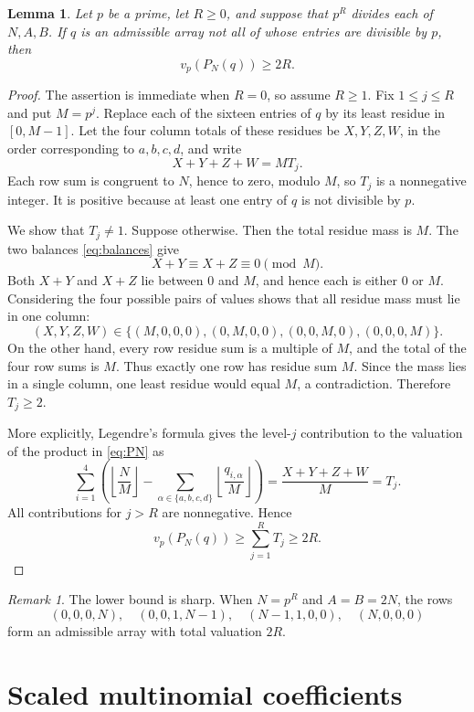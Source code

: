 \documentclass[11pt,reqno]{amsart}
\numberwithin{equation}{section}
\newtheorem{lemma}[theorem]{Lemma}
\theoremstyle{remark}
\newtheorem{remark}[theorem]{Remark}
\newcommand{\vp}{v_p}
\begin{document}
\begin{lemma}\label{lem:primitive}
Let \(p\) be a prime, let \(R\geq0\), and suppose that \(p^R\) divides
each of \(N,A,B\).
If \(q\) is an admissible array not all of whose entries are divisible by
\(p\), then
\[
\vp(P_N(q))\geq2R.
\]
\end{lemma}

\begin{proof}
The assertion is immediate when \(R=0\), so assume \(R\geq1\).
Fix \(1\leq j\leq R\) and put \(M=p^j\).  Replace each of the sixteen
entries of \(q\) by its least residue in \([0,M-1]\).  Let the four column
totals of these residues be \(X,Y,Z,W\), in the order corresponding to
\(a,b,c,d\), and write
\[
X+Y+Z+W=MT_j.
\]
Each row sum is congruent to \(N\), hence to zero, modulo \(M\), so
\(T_j\) is a nonnegative integer.  It is positive because at least one
entry of \(q\) is not divisible by \(p\).

We show that \(T_j\neq1\).  Suppose otherwise.  Then the total residue mass
is \(M\).  The two balances \eqref{eq:balances} give
\[
X+Y\equiv X+Z\equiv0\pmod M.
\]
Both \(X+Y\) and \(X+Z\) lie between \(0\) and \(M\), and hence each is
either \(0\) or \(M\).  Considering the four possible pairs of values shows
that all residue mass must lie in one column:
\[
(X,Y,Z,W)\in
\{(M,0,0,0),(0,M,0,0),(0,0,M,0),(0,0,0,M)\}.
\]
On the other hand, every row residue sum is a multiple of \(M\), and the
total of the four row sums is \(M\).  Thus exactly one row has residue sum
\(M\).  Since the mass lies in a single column, one least residue would
equal \(M\), a contradiction.  Therefore \(T_j\geq2\).

More explicitly, Legendre's formula gives the level-\(j\) contribution to
the valuation of the product in \eqref{eq:PN} as
\[
 \sum_{i=1}^4\left(\left\lfloor\frac{N}{M}\right\rfloor
 -\sum_{\alpha\in\{a,b,c,d\}}
  \left\lfloor\frac{q_{i,\alpha}}{M}\right\rfloor\right)
 =\frac{X+Y+Z+W}{M}=T_j.
\]
All contributions for \(j>R\) are nonnegative.  Hence
\[
\vp(P_N(q))\geq\sum_{j=1}^RT_j\geq2R.
\]
\end{proof}

\begin{remark}
The lower bound is sharp.  When \(N=p^R\) and \(A=B=2N\), the rows
\[
(0,0,0,N),\quad(0,0,1,N-1),\quad
(N-1,1,0,0),\quad(N,0,0,0)
\]
form an admissible array with total valuation \(2R\).
\end{remark}

\section{Scaled multinomial coefficients}
\end{document}
